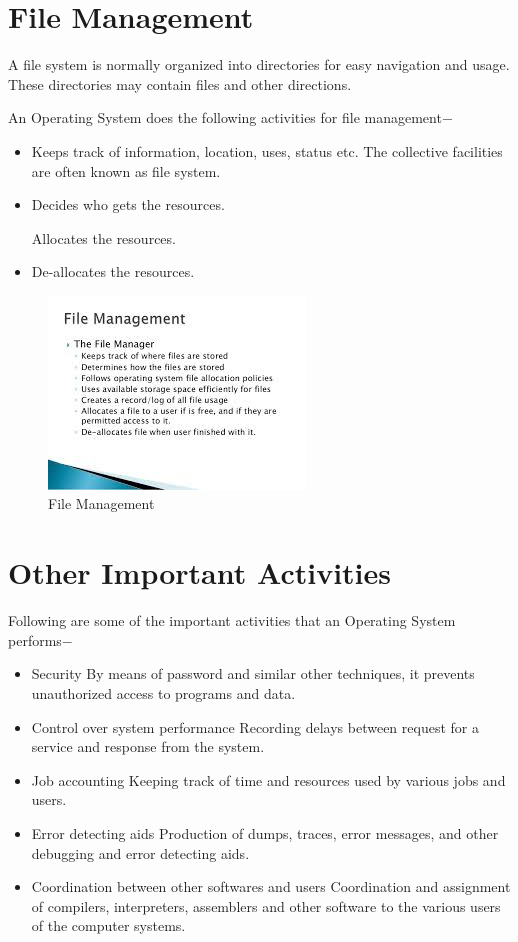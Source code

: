 \documentclass[a4paper,10pt]{article}
\begin{document}
  \section{File Management}
A file system is normally organized into directories for easy navigation and usage. These directories may contain files and other directions.

An Operating System does the following activities for file management$-$
 \begin{itemize}
   \item Keeps track of information, location, uses, status etc. The collective facilities are often known as file system.
   \item Decides who gets the resources.

Allocates the resources.
   \item De-allocates the resources.
 \end{itemize}
 \begin{figure}[h]
 \centering
\includegraphics{fm}
\caption{File Management}
\end{figure}
   \newpage
  \section{Other Important Activities}
Following are some of the important activities that an Operating System performs$-$
  \begin{itemize}
    \item {\large Security} By means of password and similar other techniques, it prevents unauthorized access to programs and data.
    \item {\large Control over system performance} Recording delays between request for a service and response from the system.
    \item {\large Job accounting} Keeping track of time and resources used by various jobs and users. 
     \item {\large Error detecting aids}  Production of dumps, traces, error messages, and other debugging and error detecting aids.
     \item {\large Coordination between other softwares and users}  Coordination and assignment of compilers, interpreters, assemblers and other software to the various users of the computer systems.
  \end{itemize}
  
\end{document}
